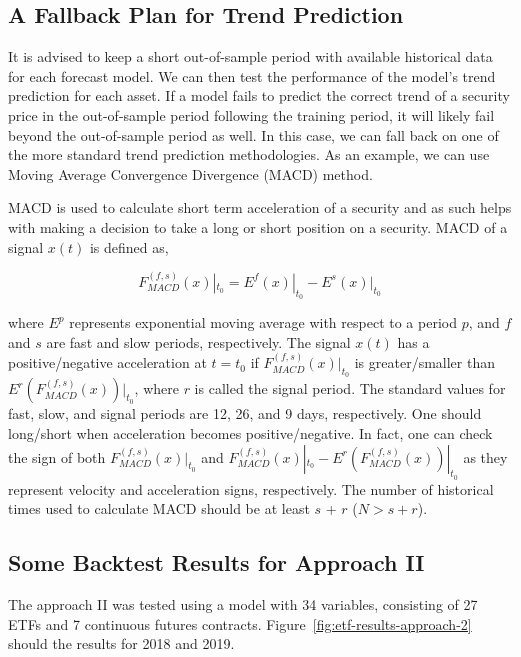 \documentclass{article}
\begin{document}
\subsection{A Fallback Plan for Trend Prediction}\label{subsection:fallback-macd}

It is advised to keep a short out-of-sample period with available
historical data for each forecast model. We can then test the
performance of the model's trend prediction for each asset. If a model
fails to predict the correct trend of a security price in the
out-of-sample period following the training period, it will likely
fail beyond the out-of-sample period as well. In this case, we can
fall back on one of the more standard trend prediction
methodologies. As an example, we can use Moving Average Convergence
Divergence (MACD) method.

MACD is used to calculate short term acceleration of a security and as
such helps with making a decision to take a long or short position on
a security. MACD of a signal $x(t)$ is defined as,

\begin{equation}\label{eqn:macd}
F_{MACD}^{(f,s)}(x)|_{t_{0}} = E^{f}(x)|_{t_{0}} -
E^{s}(x)|_{t_{0}}
\end{equation}

where $E^{p}$ represents exponential moving average with respect to a
period $p$, and $f$ and $s$ are fast and slow periods,
respectively. The signal $x(t)$ has a positive/negative acceleration
at $t=t_{0}$ if $F_{MACD}^{(f,s)}(x)|_{t_{0}}$ is
greater/smaller than $E^{r}(F_{MACD}^{(f,s)}(x))|_{t_{0}}$, where
$r$ is called the signal period. The standard values for fast, slow,
and signal periods are 12, 26, and 9 days, respectively. One should
long/short when acceleration becomes positive/negative. In fact, one
can check the sign of both $F_{MACD}^{(f,s)}(x)|_{t_{0}}$ and
$F_{MACD}^{(f,s)}(x)|_{t_{0}}-E^{r}(F_{MACD}^{(f,s)}(x))|_{t_{0}}$
as they represent velocity and acceleration signs, respectively. The
number of historical times used to calculate MACD should be at least
$s$ + $r$ ($N > s + r$).

\subsection{Some Backtest Results for Approach II}\label{subsection:fallback-macd}

The approach II was tested using a model with 34 variables, consisting
of 27 ETFs and 7 continuous futures
contracts. Figure~\ref{fig:etf-results-approach-2} should the results
for 2018 and 2019.
\end{document}
